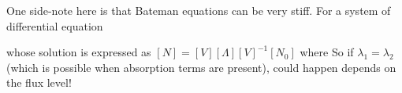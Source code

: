 \documentclass{school-22.211-notes}
\begin{document}
One side-note here is that Bateman equations can be very stiff. For a system of differential equation 

whose solution is expressed as $[N] = [V] [\Lambda] [V]^{-1} [N_0]$ where 
So if $\lambda_1 = \lambda_2$ (which is possible when absorption terms are present),  could happen depends on the flux level!
\end{document}
